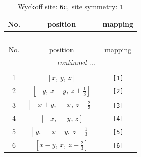 \documentclass[fleqn,8pt]{jsarticle}
\begin{document}
\renewcommand{\arraystretch}{1.2}
\begin{longtable}{ccc}
\caption{Wyckoff site: {\tt 6c}, site symmetry: {\tt 1}}
 \\
 \hline \hline
No. & position & mapping \\ \hline \endfirsthead

\multicolumn{2}{l}{\tablename\ \thetable{}} \\
 \hline \hline
No. & position & mapping \\ \hline \endhead

 \hline \hline
\multicolumn{2}{r}{\footnotesize\it continued ...} \\ \endfoot

 \hline \hline
\multicolumn{2}{r}{} \\ \endlastfoot

1 & $\left[ x,\, y,\, z \right]$ & {\tt [1]} \\ \hline
2 & $\left[ - y,\, x - y,\, z + \frac{1}{3} \right]$ & {\tt [2]} \\ \hline
3 & $\left[ - x + y,\, - x,\, z + \frac{2}{3} \right]$ & {\tt [3]} \\ \hline
4 & $\left[ - x,\, - y,\, z \right]$ & {\tt [4]} \\ \hline
5 & $\left[ y,\, - x + y,\, z + \frac{1}{3} \right]$ & {\tt [5]} \\ \hline
6 & $\left[ x - y,\, x,\, z + \frac{2}{3} \right]$ & {\tt [6]} \\
\end{longtable}
\end{document}
